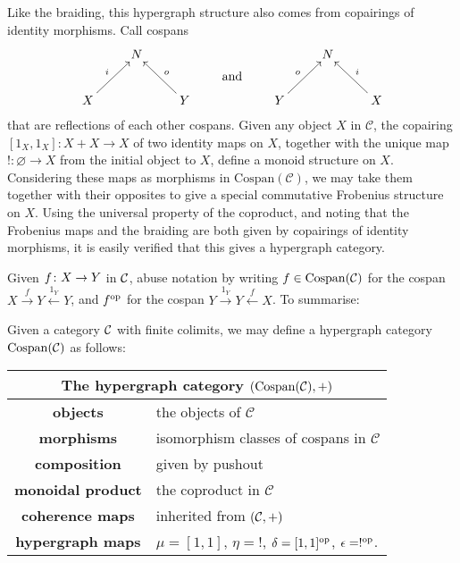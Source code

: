 Like the braiding, this hypergraph structure also comes from copairings of
identity morphisms.  Call cospans 
\[
  \xymatrix{
    & N \\
    X \ar[ur]^{i} && Y \ar[ul]_{o}
  }
  \qquad \xymatrix@R=8pt{\\\textrm{and}} \qquad 
  \xymatrix{
    & N \\
    Y \ar[ur]^{o} && X \ar[ul]_{i}
  }
\]
that are reflections of each other  cospans. Given any object
$X$ in $\mathcal C$, the copairing $[1_X,1_X]\colon  X + X \to X$ of two identity
maps on $X$, together with the unique map $!\colon  \varnothing \to X$ from the
initial object to $X$, define a monoid structure on $X$. Considering these
maps as morphisms in $\mathrm{Cospan(\mathcal C)}$, we may take them together
with their opposites to give a special commutative Frobenius structure on $X$.
Using the universal property of the coproduct, and noting that the Frobenius
maps and the braiding are both given by copairings of identity morphisms, it is
easily verified that this gives a hypergraph category.

Given $f {\colon} X \to Y$ in $\mathcal C$, abuse notation by writing $f \in
\mathrm{Cospan}(\mathcal C)$ for the cospan $X \stackrel{f}\to Y
\stackrel{1_Y}\leftarrow Y$, and $f^{\mathrm{op}}$ for the cospan $Y \stackrel{1_Y}\to Y
\stackrel{f}\leftarrow X$. To summarise:

\begin{proposition}
  Given a category $\mathcal C$ with finite colimits, we may define a hypergraph
  category $\operatorname{{Cospan}}(\mathcal C)$ as follows:
\smallskip 

  \begin{center}
  \begin{tabular}{ |c| p{}|}
      \hline
      \multicolumn{2}{|c|}{The hypergraph category $(\mathrm{Cospan(\mathcal C)},+)$} \\
    \hline
    \textbf{objects} & the objects of $\mathcal C$ \\ 
    \textbf{morphisms} & isomorphism classes of cospans in
    $\mathcal C$\\ 
  \textbf{composition} & given by pushout \\
  \textbf{monoidal product} & the coproduct in $\mathcal C$ \\
  \textbf{coherence maps} & inherited from $(\mathcal C,+)$\\
  \textbf{hypergraph maps} & $\mu = [1,1]$, $\eta = !$,
  $\delta = [1,1]^{\mathrm{op}}$, $\epsilon = !^{\mathrm{op}}$. \\
      \hline
  \end{tabular}
\end{center}
\smallskip
\end{proposition}


